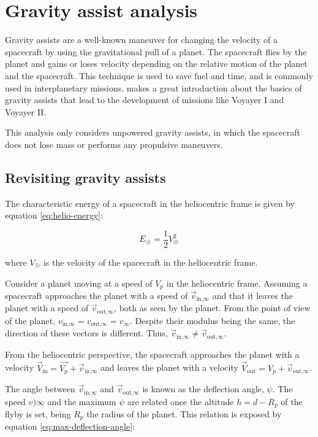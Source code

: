 \section{Gravity assist analysis}

Gravity assists are a well-known maneuver for changing the velocity of a
spacecraft by using the gravitational pull of a planet. The spacecraft flies by
the planet and gains or loses velocity depending on the relative motion of the
planet and the spacecraft. This technique is used to save fuel and time, and is
commonly used in interplanetary missions. \cite{flandro1966} makes a great
introduction about the basics of gravity assists that lead to the development of
missions like Voyayer I and Voyayer II.

This analysis only considers unpowered gravity assists, in which the spacecraft
does not lose mass or performs any propulsive maneuvers.

\subsection{Revisiting gravity assists}

The characteristic energy of a spacecraft in the heliocentric frame is given by
equation \ref{eq:helio-energy}:

\begin{equation}
        E_{\Sun} = \frac{1}{2}V_{\Sun}^2
    \label{eq:helio-energy}
\end{equation}

where $V_{\Sun}$ is the velocity of the spacecraft in the heliocentric frame.

Consider a planet moving at a speed of $V_p$ in the heliocentric frame. Assuming
a spacecraft approaches the planet with a speed of $\vec{v}_{\text{in,}\infty}$
and that it leaves the planet with a speed of $\vec{v}_{\text{out,}\infty}$,
both as seen by the planet. From the point of view of the planet,
$v_{\text{in,}\infty} = v_{\text{out,}\infty} = v_{\infty}$. Despite their
modulus being the same, the direction of these vectors is different. Thus,
$\vec{v}_{\text{in,}\infty} \neq \vec{v}_{\text{out,}\infty}$.

From the heliocentric perspective, the spacecraft approaches the planet with a
velocity $\vec{V}_{\text{in}} = \vec{V_p} + \vec{v}_{\text{in,}\infty}$ and
leaves the planet with a velocity $\vec{V}_{\text{out}} = V_p +
\vec{v}_{\text{out,}\infty}$.

The angle between $\vec{v}_{\text{in,}\infty}$ and $\vec{v}_{\text{out,}\infty}$
is known as the deflection angle, $\psi$. The speed $v){\infty}$ and the maximum
$\psi$ are related once the altitude $h = d - R_p$ of the flyby is set, being
$R_p$ the radius of the planet. This relation is exposed by equation
\ref{eq:max-deflection-angle}:

